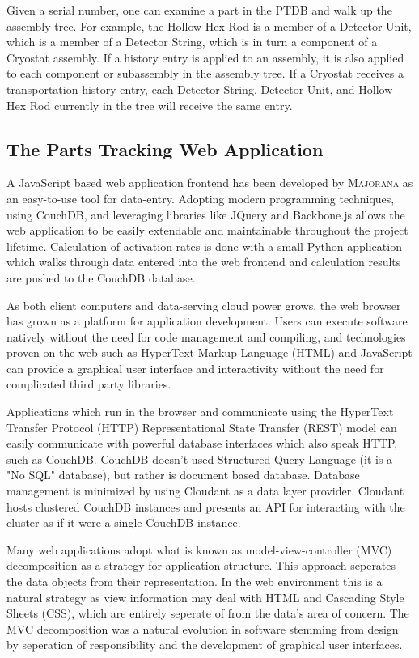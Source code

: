 \documentclass[journal]{IEEEtran}
\begin{document}
Given a serial number, one can examine a part in the PTDB and walk up the assembly tree. For example, the Hollow Hex Rod is a member
of a Detector Unit, which is a member of a Detector String, which is in turn a component of a Cryostat assembly.
If a history entry is applied to an assembly, it is also applied to each component or sub\-assembly in the assembly tree. If a Cryostat receives
a transportation history entry, each Detector String, Detector Unit, and Hollow Hex Rod currently in the tree will receive the same entry.

\subsection{The Parts Tracking Web Application}
A JavaScript based web application frontend has been developed by \textsc{Majorana} as an easy-to-use tool for data-entry.
Adopting modern programming techniques, using CouchDB, and leveraging libraries like JQuery and Backbone.js allows the
web application to be easily extendable and maintainable throughout the project lifetime. Calculation of
activation rates is done with a small Python application which walks through data entered into the web
frontend and calculation results are pushed to the CouchDB database.

As both client computers and data-serving cloud power grows, the web browser has grown as a
platform for application development. Users can execute software natively without
the need for code management and compiling, and technologies proven on the web such as HyperText Markup Language (HTML)
and JavaScript can provide a graphical user interface and interactivity without the need
for complicated third party libraries. 

Applications which run in the browser and communicate using the HyperText Transfer Protocol (HTTP) Representational State Transfer
(REST) model can easily communicate with powerful database interfaces which also speak HTTP, such as
CouchDB. CouchDB doesn't used Structured Query Language (it is a "No SQL" database), but 
rather is document based database.
Database management is minimized by using Cloudant as a data layer provider. Cloudant
hosts clustered CouchDB instances and presents an API for interacting with the cluster
as if it were a single CouchDB instance.

Many web applications adopt what is known as model-view-controller (MVC) decomposition
as a strategy for application structure. This approach seperates the data objects from
their representation. In the web environment this is a natural strategy as view information
may deal with HTML and Cascading Style Sheets (CSS), which are entirely seperate of from the data's area of concern.
The MVC decomposition was a natural evolution in software stemming from design by
seperation of responsibility and the development of graphical user interfaces.
\end{document}
